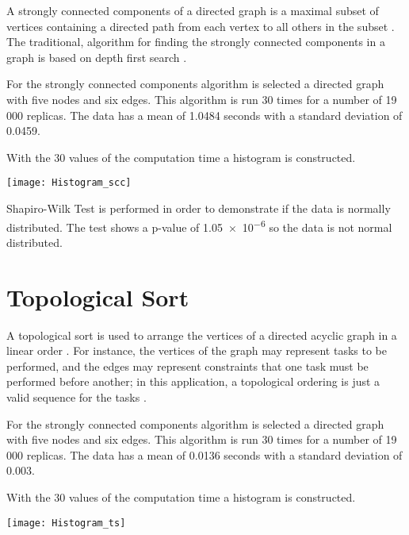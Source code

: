 \documentclass[10pt,a4paper,openany]{article}
\begin{document}
	A strongly connected components of a directed graph is a maximal subset of vertices containing a directed path from each vertex to all others in the subset \citep{fleischer2000identifying}. The traditional, algorithm for finding the strongly connected components in a graph is based on depth first search \citep{mclendon2005finding}.
	
	
	
	For the strongly connected components algorithm is selected a directed graph with five nodes and six edges. This algorithm is run 30 times for a number of 19 000 replicas. The data has a mean of 1.0484 seconds with a standard deviation of 0.0459.
	
	With the 30 values of the computation time a histogram is constructed.
	
	\begin{center}
		\texttt{[image: Histogram\_scc]}
	\end{center}

	Shapiro-Wilk Test is performed in order to demonstrate if the data is normally distributed. The test shows a p-value of \num{1.05e-6} so the data is not normal distributed.

\newpage
	
	\section*{Topological Sort}
	A topological sort is used to arrange the vertices of a directed acyclic graph in a linear order \citep{pearce2007dynamic}. For instance, the vertices of the graph may represent tasks to be performed, and the edges may represent constraints that one task must be performed before another; in this application, a topological ordering is just a valid sequence for the tasks \citep{dekel1981parallel}.
	
	
	
	For the strongly connected components algorithm is selected a directed graph with five nodes and six edges. This algorithm is run 30 times for a number of 19 000 replicas. The data has a mean of 0.0136 seconds with a standard deviation of 0.003.
	
	With the 30 values of the computation time a histogram is constructed.
	
	\begin{center}
		\texttt{[image: Histogram\_ts]}
	\end{center}
\end{document}
